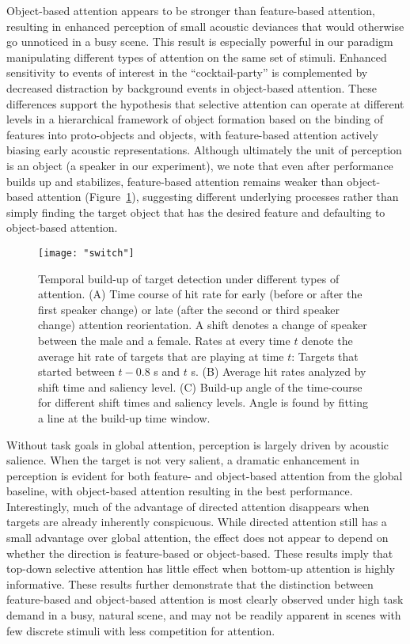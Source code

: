 \documentclass[9pt,twocolumn,twoside]{pnas-new}
\begin{document}
Object-based attention appears to be stronger than feature-based attention, resulting in enhanced perception of small acoustic deviances that would otherwise go unnoticed in a busy scene. This result is especially powerful in our paradigm manipulating different types of attention on the same set of stimuli. Enhanced sensitivity to events of interest in the ``cocktail-party'' is complemented by decreased distraction by background events in object-based attention. These differences support the hypothesis that selective attention can operate at different levels in a hierarchical framework of object formation based on the binding of features into proto-objects and objects, with feature-based attention actively biasing early acoustic representations. Although ultimately the unit of perception is an object (a speaker in our experiment), we note that even after performance builds up and stabilizes, feature-based attention remains weaker than object-based attention (Figure~\ref{fig:attn_switch}), suggesting different underlying processes rather than simply finding the target object that has the desired feature and defaulting to object-based attention.

\begin{figure}[t]
\centering
\texttt{[image: "switch"]}
\caption[Temporal build-up of auditory attention.]{Temporal build-up of target detection under different types of attention. (A) Time course of hit rate for early (before or after the first speaker change) or late (after the second or third speaker change) attention reorientation. A shift denotes a change of speaker between the male and a female. Rates at every time $t$ denote the average hit rate of targets that are playing at time $t$: Targets that started between $t-0.8$ s and $t$ s. (B) Average hit rates analyzed by shift time and saliency level. (C) Build-up angle of the time-course for different shift times and saliency levels. Angle is found by fitting a line at the  build-up time window.}
\label{fig:attn_switch}
\end{figure}

Without task goals in global attention, perception is largely driven by acoustic salience. When the target is not very salient, a dramatic enhancement in perception is evident for both feature- and object-based attention from the global baseline, with object-based attention resulting in the best performance. Interestingly, much of the advantage of directed attention disappears when targets are already inherently conspicuous. While directed attention still has a small advantage over global attention, the effect does not appear to depend on whether the direction is feature-based or object-based. These results imply that top-down selective attention has little effect when bottom-up attention is highly informative. These results further demonstrate that the distinction between feature-based and object-based attention is most clearly observed under high task demand in a busy, natural scene, and may not be readily apparent in scenes with few discrete stimuli with less competition for attention.
\end{document}
